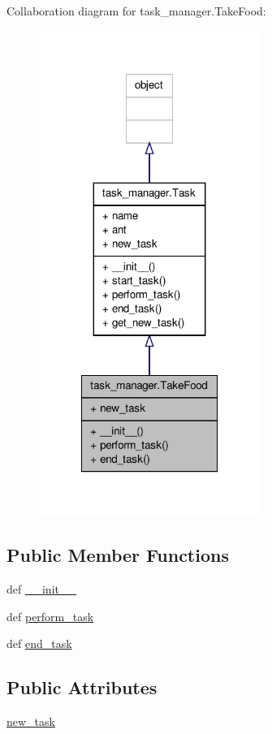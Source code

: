 Collaboration diagram for task\+\_\+manager.\+Take\+Food\+:\nopagebreak
\begin{figure}[H]
\begin{center}
\leavevmode
\includegraphics[width=204pt]{classtask__manager_1_1TakeFood__coll__graph}
\end{center}
\end{figure}
\subsection*{Public Member Functions}
\begin{DoxyCompactItemize}
\item 
def \hyperlink{classtask__manager_1_1TakeFood_a4c5cc2bb37fc196bc5cb34f56fa62a29}{\+\_\+\+\_\+init\+\_\+\+\_\+}
\item 
def \hyperlink{classtask__manager_1_1TakeFood_af42eebb5d9ee945cafd05908d478bab3}{perform\+\_\+task}
\item 
def \hyperlink{classtask__manager_1_1TakeFood_a01c78eece0496ccd7c7badde7ce848b4}{end\+\_\+task}
\end{DoxyCompactItemize}
\subsection*{Public Attributes}
\begin{DoxyCompactItemize}
\item 
\hyperlink{classtask__manager_1_1TakeFood_a592252f7a2b882cf283c9da9cbab07a2}{new\+\_\+task}
\end{DoxyCompactItemize}


